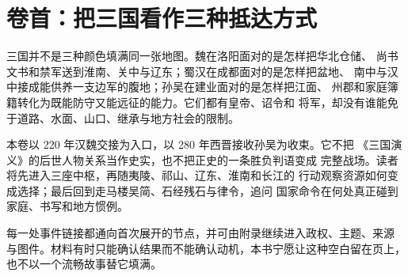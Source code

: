 \chapter*{卷首：把三国看作三种抵达方式}

三国并不是三种颜色填满同一张地图。魏在洛阳面对的是怎样把华北仓储、
尚书文书和禁军送到淮南、关中与辽东；蜀汉在成都面对的是怎样把盆地、
南中与汉中接成能供养一支边军的腹地；孙吴在建业面对的是怎样把江面、
州郡和家庭簿籍转化为既能防守又能远征的能力。它们都有皇帝、诏令和
将军，却没有谁能免于道路、水面、山口、继承与地方社会的限制。

本卷以 220 年汉魏交接为入口，以 280 年西晋接收孙吴为收束。它不把
《三国演义》的后世人物关系当作史实，也不把正史的一条胜负判语变成
完整战场。读者将先进入三座中枢，再随夷陵、祁山、辽东、淮南和长江的
行动观察资源如何变成选择；最后回到走马楼吴简、石经残石与律令，追问
国家命令在何处真正碰到家庭、书写和地方惯例。

每一处事件链接都通向首次展开的节点，并可由附录继续进入政权、主题、来源
与图件。材料有时只能确认结果而不能确认动机，本书宁愿让这种空白留在页上，
也不以一个流畅故事替它填满。
